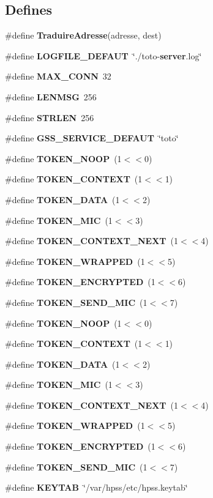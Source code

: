 \subsection*{Defines}
\begin{CompactItemize}
\item 
\#define {\bf Traduire\-Adresse}(adresse, dest)
\item 
\#define {\bf LOGFILE\_\-DEFAUT}\ \char`\"{}./toto-{\bf server}.log\char`\"{}
\item 
\#define {\bf MAX\_\-CONN}\ 32
\item 
\#define {\bf LENMSG}\ 256
\item 
\#define {\bf STRLEN}\ 256
\item 
\#define {\bf GSS\_\-SERVICE\_\-DEFAUT}\ \char`\"{}toto\char`\"{}
\item 
\#define {\bf TOKEN\_\-NOOP}\ (1$<$$<$0)
\item 
\#define {\bf TOKEN\_\-CONTEXT}\ (1$<$$<$1)
\item 
\#define {\bf TOKEN\_\-DATA}\ (1$<$$<$2)
\item 
\#define {\bf TOKEN\_\-MIC}\ (1$<$$<$3)
\item 
\#define {\bf TOKEN\_\-CONTEXT\_\-NEXT}\ (1$<$$<$4)
\item 
\#define {\bf TOKEN\_\-WRAPPED}\ (1$<$$<$5)
\item 
\#define {\bf TOKEN\_\-ENCRYPTED}\ (1$<$$<$6)
\item 
\#define {\bf TOKEN\_\-SEND\_\-MIC}\ (1$<$$<$7)
\item 
\#define {\bf TOKEN\_\-NOOP}\ (1$<$$<$0)
\item 
\#define {\bf TOKEN\_\-CONTEXT}\ (1$<$$<$1)
\item 
\#define {\bf TOKEN\_\-DATA}\ (1$<$$<$2)
\item 
\#define {\bf TOKEN\_\-MIC}\ (1$<$$<$3)
\item 
\#define {\bf TOKEN\_\-CONTEXT\_\-NEXT}\ (1$<$$<$4)
\item 
\#define {\bf TOKEN\_\-WRAPPED}\ (1$<$$<$5)
\item 
\#define {\bf TOKEN\_\-ENCRYPTED}\ (1$<$$<$6)
\item 
\#define {\bf TOKEN\_\-SEND\_\-MIC}\ (1$<$$<$7)
\item 
\#define {\bf KEYTAB}\ \char`\"{}/var/hpss/etc/hpss.keytab\char`\"{}
\end{CompactItemize}
